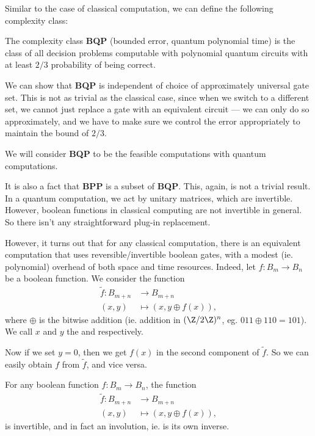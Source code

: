\documentclass[a4paper]{article}
\begin{document}
Similar to the case of classical computation, we can define the following complexity class:
\begin{defi}
  The complexity class \textbf{BQP} (bounded error, quantum polynomial time) is the class of all decision problems computable with polynomial quantum circuits with at least $2/3$ probability of being correct.
\end{defi}
We can show that \textbf{BQP} is independent of choice of approximately universal gate set. This is not as trivial as the classical case, since when we switch to a different set, we cannot just replace a gate with an equivalent circuit --- we can only do so approximately, and we have to make sure we control the error appropriately to maintain the bound of $2/3$.

We will consider \textbf{BQP} to be the feasible computations with quantum computations.

It is also a fact that \textbf{BPP} is a subset of \textbf{BQP}. This, again, is not a trivial result. In a quantum computation, we act by unitary matrices, which are invertible. However, boolean functions in classical computing are not invertible in general. So there isn't any straightforward plug-in replacement.

However, it turns out that for any classical computation, there is an equivalent computation that uses reversible/invertible boolean gates, with a modest (ie. polynomial) overhead of both space and time resources. Indeed, let $f: B_m \to B_n$ be a boolean function. We consider the function
\begin{align*}
  \tilde{f}: B_{m + n} &\to B_{m + n}\\
  (x, y) &\mapsto (x, y \oplus f(x)),
\end{align*}
where $\oplus$ is the bitwise addition (ie. addition in $(\Z/2\Z)^n$, eg. $011 \oplus 110 = 101$). We call $x$ and $y$ the  and  respectively.

Now if we set $y = 0$, then we get $f(x)$ in the second component of $\tilde{f}$. So we can easily obtain $f$ from $\tilde{f}$, and vice versa.

\begin{lemma}
  For any boolean function $f: B_m \to B_n$, the function
  \begin{align*}
    \tilde{f}: B_{m + n} &\to B_{m + n}\\
    (x, y) &\mapsto (x, y \oplus f(x)),
  \end{align*}
  is invertible, and in fact an involution, ie. is its own inverse.
\end{lemma}
\end{document}
